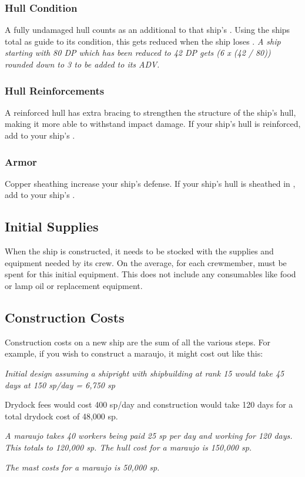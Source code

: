 \begin{multicols*}{2}
\subsubsection{Hull Condition}
A fully undamaged hull counts as an additional  to that ship’s \ADV. Using the ships \DP total as guide to its condition, this gets reduced when the ship loses \DP. \textit{A ship starting with 80 DP which has been reduced to 42 DP gets (6 x (42 / 80)) rounded down to 3 to be added to its ADV.}
\subsubsection{Hull Reinforcements}
A reinforced hull has extra bracing to strengthen the structure of the ship’s hull, making it more able to withstand impact damage. If your ship’s hull is reinforced, add  to your ship’s \ADV.
\subsubsection{Armor}
Copper sheathing increase your ship’s defense. If your ship’s hull is sheathed in , add  to your ship’s \ADV.
\subsection{Initial Supplies}
When the ship is constructed, it needs to be stocked with the supplies and equipment needed by its crew. On the average, for each crewmember,  must be spent for this initial equipment. This does not include any consumables like food or lamp oil or replacement equipment.
\subsection{Construction Costs}
Construction costs on a new ship are the sum of all
the various steps. For example, if you wish to construct a
maraujo, it might cost out like this:

\textit{Initial design assuming a shipright with shipbuilding at rank 15 would take 45 days at 150 sp/day = 6,750 sp}

Drydock fees would cost 400 sp/day and construction would take 120 days for a total drydock cost of 48,000 sp.

\textit{A maraujo takes 40 workers being paid 25 sp per day and working for 120 days. This totals to 120,000 sp. The hull cost for a maraujo is 150,000 sp.}

\textit{The mast costs for a maraujo is 50,000 sp.}


\end{multicols*}
